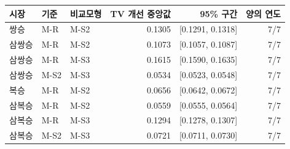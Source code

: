 \begin{tabular}{lllrrr}
\toprule
시장 & 기준 & 비교모형 & TV 개선 중앙값 & 95\% 구간 & 양의 연도 \\
\midrule
쌍승 & M-R & M-S2 & 0.1305 & [0.1291, 0.1318] & 7/7 \\
\addlinespace
삼쌍승 & M-R & M-S2 & 0.1073 & [0.1057, 0.1087] & 7/7 \\
삼쌍승 & M-R & M-S3 & 0.1615 & [0.1590, 0.1635] & 7/7 \\
삼쌍승 & M-S2 & M-S3 & 0.0534 & [0.0523, 0.0548] & 7/7 \\
\addlinespace
복승 & M-R & M-S2 & 0.0656 & [0.0642, 0.0672] & 7/7 \\
\addlinespace
삼복승 & M-R & M-S2 & 0.0559 & [0.0555, 0.0564] & 7/7 \\
삼복승 & M-R & M-S3 & 0.1294 & [0.1278, 0.1307] & 7/7 \\
삼복승 & M-S2 & M-S3 & 0.0721 & [0.0711, 0.0730] & 7/7 \\
\bottomrule
\end{tabular}
